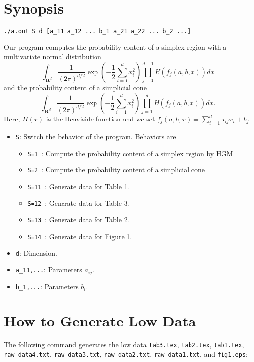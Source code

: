 \documentclass[12pt]{article}
\begin{document}
\section{Synopsis}
\begin{verbatim}
./a.out S d [a_11 a_12 ... b_1 a_21 a_22 ... b_2 ...]
\end{verbatim}
Our program computes 
the probability content of a simplex region
with a multivariate normal distribution
$$
\int_{\mathbf R^d} \frac{1}{(2\pi)^{d/2}}
\exp\left(-\frac{1}{2}\sum_{i=1}^dx_i^2\right)
\prod_{j=1}^{d+1}H\left(f_j(a,b,x)\right)
dx
$$
and the probability content of a simplicial cone
$$
\int_{\mathbf R^d} \frac{1}{(2\pi)^{d/2}}
\exp\left(-\frac{1}{2}\sum_{i=1}^dx_i^2\right)
\prod_{j=1}^dH\left(f_j(a,b,x)\right)
dx.
$$
Here, $H(x)$ is the Heaviside function and we set 
$f_j(a,b,x)=\sum_{i=1}^da_{ij}x_i+b_j$.
\begin{itemize}
\item \verb+S+\/: Switch the behavior of the program. Behaviors are
  \begin{itemize}
    \item \verb+S=1+\ : %
    Compute the probability content of a simplex region by HGM
    \item \verb+S=2+\ : %
    Compute the probability content of a simplicial cone
    \item \verb+S=11+\ : %
    Generate data for Table 1.
    \item \verb+S=12+\ : %
    Generate data for Table 3.
    \item \verb+S=13+\ : %
    Generate data for Table 2.
    \item \verb+S=14+\ : %
    Generate data for Figure 1.
  \end{itemize}
\item \verb+d+\/: Dimension.
\item \verb+a_11,...+\/: Parameters $a_{ij}$.
\item \verb+b_1,...+\/: Parameters $b_i$.
\end{itemize}


\section{How to Generate Low Data}
The following command generates the low data
{\tt tab3.tex}, 
{\tt tab2.tex}, 
{\tt tab1.tex}, 
{\tt raw\_data4.txt}, 
{\tt raw\_data3.txt}, 
{\tt raw\_data2.txt},
{\tt raw\_data1.txt}, and
{\tt fig1.eps}:
\end{document}

